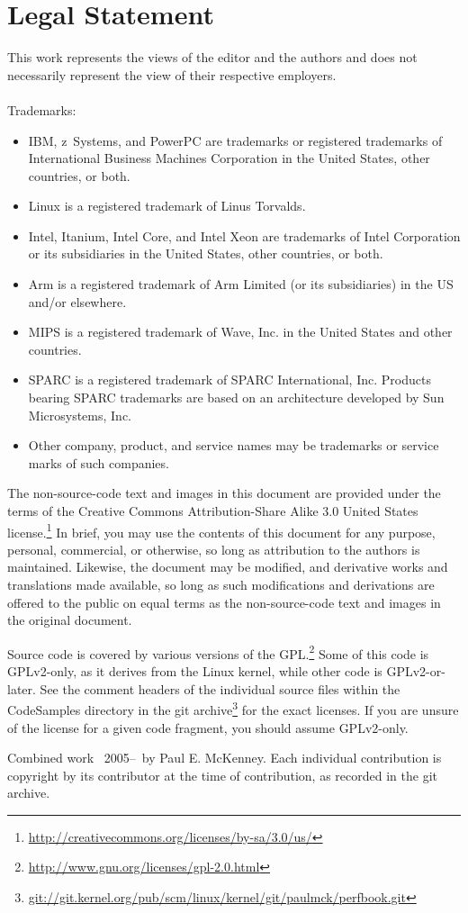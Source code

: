 
\section*{Legal Statement}

This work represents the views of the editor and the authors and does not
necessarily represent the view of their respective employers. \\
\\
Trademarks:
\begin{itemize}
\item	IBM, z~Systems, and PowerPC are trademarks or registered trademarks
	of International Business Machines Corporation in the United
	States, other countries, or both.
\item	Linux is a registered trademark of Linus Torvalds.
\item	Intel, Itanium, Intel Core, and Intel Xeon are trademarks
	of Intel Corporation or its subsidiaries in the United States,
	other countries, or both.
\item	Arm is a registered trademark of Arm Limited (or its subsidiaries)
	in the US and/or elsewhere.
\item	MIPS is a registered trademark of Wave, Inc. in the United States
	and other countries.
\item	SPARC is a registered trademark of SPARC International, Inc.
	Products bearing SPARC trademarks are based on an architecture
	developed by Sun Microsystems, Inc.
\item	Other company, product, and service names may be trademarks or
	service marks of such companies.
\end{itemize}

The non-source-code text and images in this document are provided under
the terms of the Creative Commons Attribution-Share Alike 3.0 United
States license.\footnote{
	\url{http://creativecommons.org/licenses/by-sa/3.0/us/}}
In brief, you may use the contents of this document for any purpose,
personal, commercial, or otherwise, so long as attribution to the
authors is maintained.  Likewise, the document may be modified,
and derivative works and translations made available, so long as
such modifications and derivations are offered to the public on equal
terms as the non-source-code text and images in the original document.

Source code is covered by various versions of the GPL.\footnote{
	\url{http://www.gnu.org/licenses/gpl-2.0.html}}
Some of this code is GPLv2-only, as it derives from the Linux kernel,
while other code is GPLv2-or-later.
See the comment headers of the individual source files within the
CodeSamples directory in the git archive\footnote{
	\url{git://git.kernel.org/pub/scm/linux/kernel/git/paulmck/perfbook.git}}
for the exact licenses.
If you are unsure of the license for a given code fragment,
you should assume GPLv2-only.

Combined work {\textcopyright}~2005--\commityear\ by Paul E. McKenney.
Each individual contribution is copyright by its contributor at the time
of contribution, as recorded in the git archive.
